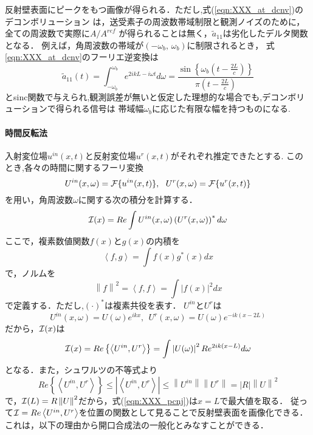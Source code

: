 反射壁表面にピークをもつ画像が得られる．ただし,式(\ref{eqn:XXX_at_dcnv})のデコンボリューション
は，送受素子の周波数帯域制限と観測ノイズのために，全ての周波数で実際に$A/A^{ref}$
が得られることは無く，$\tilde a_{11}$は劣化したデルタ関数となる．
例えば，角周波数の帯域が$(-\omega_b,\, \omega_b)$に制限されるとき，
式\ref{eqn:XXX_at_dcnv}のフーリエ逆変換は
\begin{equation}
	\tilde a_{11}(t)= 
	\int_{-\omega_b}^{\omega_b} 
	e^{2ikL-i\omega t} d\omega 
	=\frac{\sin\left\{ \omega_b \left( t-\frac{2L}{c}\right)\right\}}{\pi \left(t-\frac{2L}{c}\right)}
	\label{eqn:XXX_18}
\end{equation}
とsinc関数で与えられ,観測誤差が無いと仮定した理想的な場合でも,デコンボリューションで得られる信号は
帯域幅$\omega_b$に応じた有限な幅を持つものになる.
\paragraph{時間反転法}
入射変位場$u^{in}(x,t)$と反射変位場$u^{r}(x,t)$がそれぞれ推定できたとする.
このとき,各々の時間に関するフーリ変換
\begin{equation}
	U^{in}(x,\omega)={\cal F} \{ u^{in}(x,t)\}, \ \ 
	U^{r}(x,\omega)={\cal F} \{ u^{r}(x,t)\}
	\label{eqn:XXX_19}
\end{equation}
を用い，角周波数$\omega$に関する次の積分を計算する．
\begin{equation}
	{\cal I }(x)=
	Re 
	\int 	
	U^{in}(x,\omega)\left( U^{r}(x,\omega)\right)^* d\omega
	\label{eqn:XXX_20}
\end{equation}
ここで，複素数値関数$f(x)$と$g(x)$の内積を
\begin{equation}
	\left< f,g\right>=\int f(x)g^*(x)dx
	\label{eqn:XXX_21}
\end{equation}
で，ノルムを
\begin{equation}
	\left\| f \right\|^2=\left<f,f\right> =\int |f(x)|^2dx
	\label{eqn:XXX_21}
\end{equation}
で定義する．ただし,$(\cdot)^*$は複素共役を表す．
$U^{in}$と$U^{r}$は
\begin{equation}
	U^{in}(x,\omega)=U(\omega)e^{ikx}, \ \ 
	U^{r}(x,\omega)=U(\omega)e^{-ik(x-2L)}
	\label{eqn:XXX_22}
\end{equation}
だから，${\cal I}(x)$は
\begin{equation}
	{\cal I}(x)
	=
	Re \left\{ 
	\left< U^{in},U^{r}\right>
	\right\}
	=
	\int 
	\left| U(\omega) \right|^2 
	R
	e^{2ik(x-L)}d\omega
	\label{eqn:XXX_pcnj}
\end{equation}
となる．また，シュワルツの不等式より
\begin{equation}
	Re \left\{ \left< U^{in}, U^{r}\right> \right\}
	\leq 
	\left| \left< U^{in},U^{r} \right> \right|
	\leq  \left\| U^{in}\right\| \left\| U^{r}\right\|
	=\left| R \right|
	\left\| U\right\|^2
	\label{eqn:XXX_23}
\end{equation}
で，${\cal I}(L)=R \left\| U\right\|^2$だから，式(\ref{eqn:XXX_pcnj})は$x=L$で最大値を取る．
従って${\cal I}=Re \left<U^{in},U^{r}\right>$を位置の関数として見ることで反射壁表面を画像化できる．
これは，以下の理由から開口合成法の一般化とみなすことができる．

